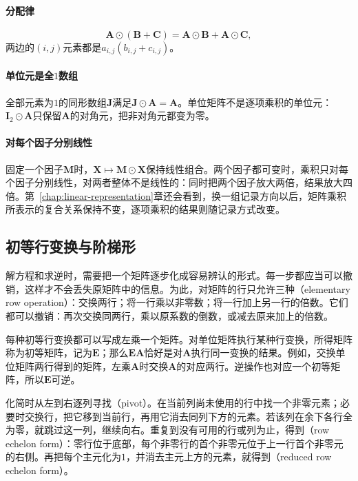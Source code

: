 \paragraph{分配律}
\[
 \bm A\odot(\bm B+\bm C)=\bm A\odot\bm B+\bm A\odot\bm C,
\]
两边的$(i,j)$元素都是$a_{i,j}(b_{i,j}+c_{i,j})$。

\paragraph{单位元是全$1$数组}
全部元素为$1$的同形数组$\bm J$满足$\bm J\odot\bm A=\bm A$。单位矩阵不是逐项乘积的单位元：$\bm I_2\odot\bm A$只保留$\bm A$的对角元，把非对角元都变为零。

\paragraph{对每个因子分别线性}
固定一个因子$\bm M$时，$\bm X\mapsto\bm M\odot\bm X$保持线性组合。两个因子都可变时，乘积只对每个因子分别线性，对两者整体不是线性的：同时把两个因子放大两倍，结果放大四倍。第~\ref{chap:linear-representation}章还会看到，换一组记录方向以后，矩阵乘积所表示的复合关系保持不变，逐项乘积的结果则随记录方式改变。

\subsection{初等行变换与阶梯形}
\label{sec:ls-elementary-row-operations}

解方程和求逆时，需要把一个矩阵逐步化成容易辨认的形式。每一步都应当可以撤销，这样才不会丢失原矩阵中的信息。为此，对矩阵的行只允许三种（elementary row operation）：交换两行；将一行乘以非零数；将一行加上另一行的倍数。它们都可以撤销：再次交换同两行，乘以原系数的倒数，或减去原来加上的倍数。

每种初等行变换都可以写成左乘一个矩阵。对单位矩阵执行某种行变换，所得矩阵称为初等矩阵，记为$\bm E$；那么$\bm E\bm A$恰好是对$\bm A$执行同一变换的结果。例如，交换单位矩阵两行得到的矩阵，左乘$\bm A$时交换$\bm A$的对应两行。逆操作也对应一个初等矩阵，所以$\bm E$可逆。

化简时从左到右逐列寻找（pivot）。在当前列尚未使用的行中找一个非零元素；必要时交换行，把它移到当前行，再用它消去同列下方的元素。若该列在余下各行全为零，就跳过这一列，继续向右。重复到没有可用的行或列为止，得到（row echelon form）：零行位于底部，每个非零行的首个非零元位于上一行首个非零元的右侧。再把每个主元化为$1$，并消去主元上方的元素，就得到（reduced row echelon form）。

